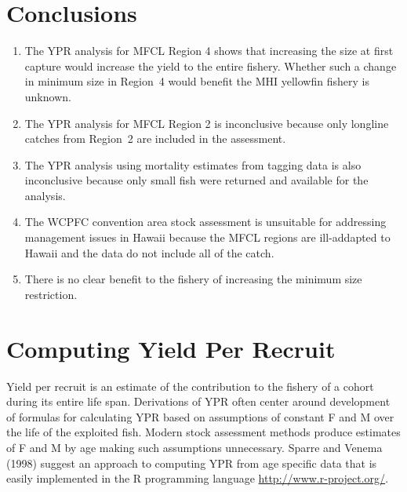 \documentclass[12pt,letterpaper,twoside]{article}
\begin{document}
\section*{Conclusions}
\begin{enumerate}
\item The YPR analysis for MFCL Region 4 shows that increasing
the size at first capture would increase the yield to the entire fishery.
Whether such a change in minimum size in Region~4 would
benefit the MHI yellowfin fishery is unknown.

\item The YPR analysis for MFCL Region 2 is inconclusive because only
longline catches from Region~2 are included in the assessment.

\item The YPR analysis using mortality estimates from tagging data is
also inconclusive because only small fish were returned and
available for the analysis. 

\item The WCPFC convention area stock assessment is unsuitable for
addressing management issues in Hawaii because the
MFCL regions are ill-addapted to Hawaii and the data do not include
all of the catch.

\item There is no clear benefit to the fishery of increasing the
minimum size restriction.
\end{enumerate}


\section*{Computing Yield Per Recruit}


Yield per recruit is an estimate of the contribution to the fishery of
a cohort during its entire life span.
Derivations of YPR often center around development of formulas for
calculating YPR based on assumptions of constant F and M over the life
of the exploited fish. Modern stock assessment methods produce
estimates of F and M by age making such assumptions unnecessary.
Sparre and Venema (1998) suggest an approach to computing YPR from age
specific data that is easily implemented in the R programming language
\url{http://www.r-project.org/}.
\end{document}
